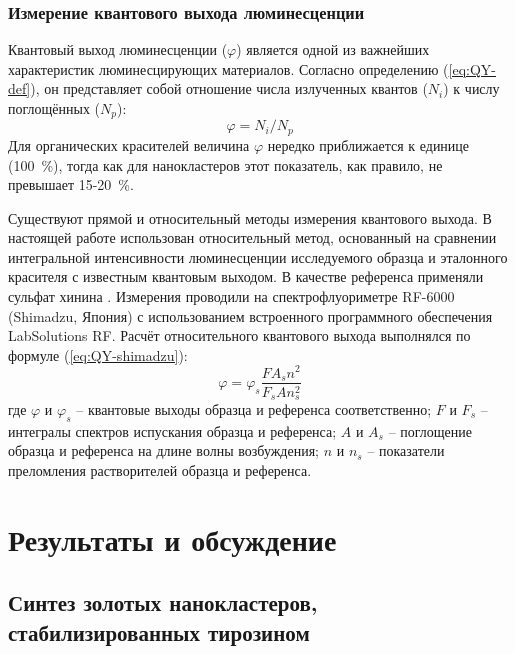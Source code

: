 \documentclass[a4paper, 12pt]{article}
\begin{document}
\begin{onehalfspace}
		\subsubsection*{Измерение квантового выхода люминесценции}

		Квантовый выход люминесценции ($\varphi$) является одной из важнейших характеристик люминесцирующих материалов.
		Согласно определению (\ref{eq:QY-def}), он представляет собой отношение числа излученных квантов ($N_i$) к числу поглощённых ($N_p$):
		\begin{equation}
			\varphi = N_i / N_p
			\label{eq:QY-def}
		\end{equation}
		Для органических красителей величина $\varphi$ нередко приближается к единице (100~\%), тогда как для нанокластеров этот показатель, как правило, не превышает 15-20~\%.

		Существуют прямой и относительный методы измерения квантового выхода. В настоящей работе использован относительный метод, основанный на сравнении интегральной интенсивности люминесценции исследуемого образца и эталонного красителя с известным квантовым выходом. В качестве референса применяли сульфат хинина \cite{eaton1988reference}. Измерения проводили на спектрофлуориметре RF-6000 (Shimadzu, Япония) с использованием встроенного программного обеспечения LabSolutions RF. Расчёт относительного квантового выхода выполнялся по формуле (\ref{eq:QY-shimadzu}):
		\begin{equation}
			\varphi = \varphi_s \frac{F A_s n^2}{F_s A n_s^2}
			\label{eq:QY-shimadzu}
		\end{equation}
		где $\varphi$ и $\varphi_s$ -- квантовые выходы образца и референса соответственно; $F$ и $F_s$ -- интегралы спектров испускания образца и референса; $A$ и $A_s$ -- поглощение образца и референса на длине волны возбуждения; $n$ и $n_s$ -- показатели преломления растворителей образца и референса.

\newpage
\section*{Результаты и обсуждение}

\subsection*{Синтез золотых нанокластеров, стабилизированных тирозином}


\end{onehalfspace}
\end{document}

